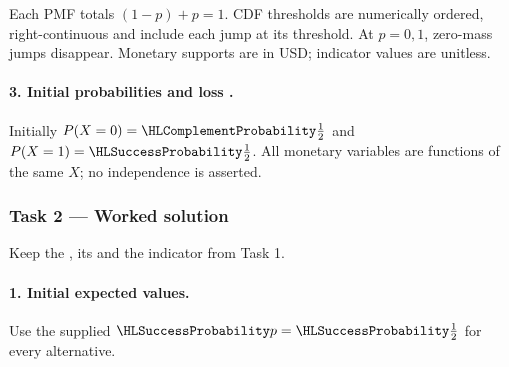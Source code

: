 Each PMF totals $(1-p)+p=1$. CDF thresholds are numerically ordered,
right-continuous and include each jump at its threshold. At $p=0,1$, zero-mass jumps disappear.
Monetary supports are in USD; indicator values are unitless.
\paragraph{3. Initial probabilities and loss \protect{}.}
Initially $P(X=0)=\FailureProb{\frac{1}{2}}$ and $P(X=1)=\SuccessProb{\frac{1}{2}}$.
All monetary variables are functions of the same $X$; no independence is asserted.
\clearpage\subsubsection*{Task 2 --- Worked solution}\label{sol:c3-coffee-decision}
Keep the , its  and the indicator from Task 1.
\paragraph{1. Initial expected values.}
Use the supplied $\SuccessProb{p}=\SuccessProb{\frac{1}{2}}$ for every alternative.
